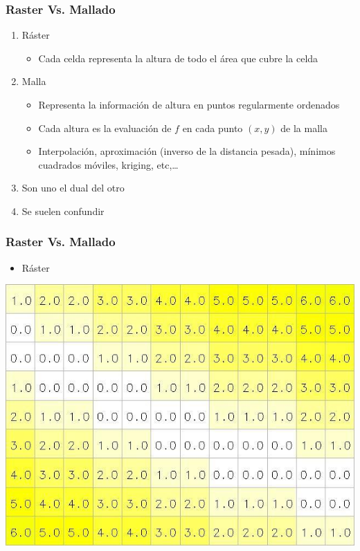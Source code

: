 \begin{frame}
  \frametitle{Raster Vs. Mallado}
  \begin{enumerate}
    \item<1-> \alert{Ráster} 
      \begin{itemize}
        \item Cada celda representa la altura de todo el área que cubre la celda
      \end{itemize}
    \item<2-> Malla
      \begin{itemize}
        \item Representa la información de altura en puntos regularmente ordenados
        \item Cada altura es la evaluación de $f$ en cada punto $(x,y)$ de la
          malla
        \item Interpolación, aproximación (inverso de la distancia pesada),
          mínimos cuadrados móviles, kriging, etc,\ldots
      \end{itemize}
        \item<3-> Son uno el dual del otro
    \item<4-> Se suelen confundir
  \end{enumerate}
\end{frame}
\begin{frame}
  \frametitle{Raster Vs. Mallado}
  \begin{itemize}
    \item Ráster 
  \end{itemize}
  \begin{center}
        \includegraphics[height=0.60\textheight]{images/raster}
  \end{center}
\end{frame}
